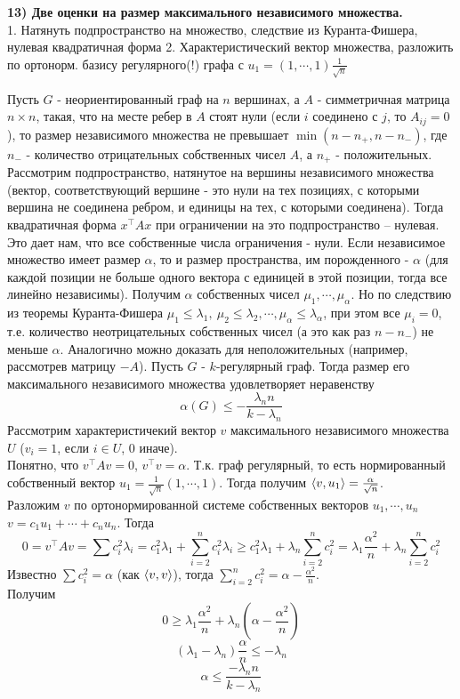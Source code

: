 \textbf{13)  Две оценки на размер максимального независимого множества.}\\
    
    1. Натянуть подпространство на  множество, следствие из Куранта-Фишера, нулевая квадратичная форма
    2. Характеристический вектор множества, разложить по ортонорм. базису регулярного(!) графа с $u_1 = (1,\cdots,1) \frac{1}{\sqrt n}$
    
    
    \thrm Пусть $G$ - неориентированный граф на $n$ вершинах, а $A$ - симметричная матрица $n \times n$, такая, что на месте ребер в $A$ стоят нули (если $i$ соединено с $j$, то $A_{ij} = 0$), то размер независимого множества не превышает $\min(n - n_{+}, n-n_{-})$, где $n_{-}$ - количество отрицательных собственных чисел $A$, а $n_{+}$ - положительных.
    \ethrm
    \proof
    Рассмотрим подпространство, натянутое на вершины независимого множества (вектор, соответствующий вершине - это нули на тех позициях, с которыми вершина не соединена ребром, и единицы на тех, с которыми соединена). Тогда квадратичная форма $x^{\top}Ax$ при ограничении на это подпространство -- нулевая. Это дает нам, что все собственные числа ограничения - нули. Если независимое множество имеет размер $\alpha$, то и размер пространства, им порожденного - $\alpha$ (для каждой позиции не больше одного вектора с единицей в этой позиции, тогда все линейно независимы). Получим $\alpha$ собственных чисел $\mu_1, \cdots, \mu_{\alpha}$. Но по следствию из теоремы Куранта-Фишера $\mu_1 \le \lambda_1,\: \mu_2 \le \lambda_2, \cdots,\mu_{\alpha} \le \lambda_{\alpha}$, при этом все $\mu_i = 0$, т.е. количество неотрицательных собственных чисел (а это как раз $n - n_{-}$) не меньше $\alpha$. Аналогично можно доказать для неположительных (например, рассмотрев матрицу $-A$).
    \endproof
    \thrm Пусть $G$ - $k$-регулярный граф. Тогда размер его максимального независимого множества удовлетворяет неравенству
    $$\alpha(G) \le - \frac{\lambda_n n}{k - \lambda_n}$$
    \ethrm
    \proof
        Рассмотрим характеристичекий вектор $v$ максимального независимого множества $U$ ($v_i = 1$, если $i \in U$, 0 иначе).\\
        Понятно, что $v^{\top}Av = 0$, $v^{\top}v = \alpha$. Т.к. граф регулярный, то есть нормированный собственный вектор $u_1 = \frac{1}{\sqrt{n}}(1,\cdots,1)$. Тогда получим $\left\langle v, u_1 \right\rangle = \frac{\alpha}{\sqrt n}$.\\
        Разложим $v$ по ортонормированной системе собственных векторов $u_1, \cdots, u_n$ $v = c_1 u_1 + \cdots + c_n u_n$. Тогда
        $$0 = v^{\top}Av = \sum c_i^2 \lambda_i = c_1^2 \lambda_1 + \sum\limits_{i=2}^{n} c_i^2 \lambda_i \ge c_1^2 \lambda_1 + \lambda_n \sum\limits_{i=2}^{n} c_i^2 = \lambda_1 \frac{\alpha^2}{n} +\lambda_n \sum\limits_{i=2}^n c_i^2$$
        Известно $\sum c_i^2 = \alpha$ (как $\left\langle v,v \right\rangle$), тогда $\sum\limits_{i=2}^{n} c_i^2 = \alpha - \frac{\alpha^2}{n}$.\\ Получим $$0 \ge \lambda_1 \frac{\alpha^2}{n} + \lambda_n\left(\alpha - \frac{\alpha^2}{n}\right)$$
         $$(\lambda_1 - \lambda_n)\frac{\alpha}{n} \le -\lambda_n$$
         $$\alpha \le \frac{-\lambda_n n}{k - \lambda_n}$$
        
    \endproof